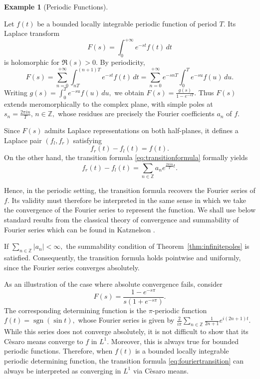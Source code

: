 \documentclass[12pt]{article}
\theoremstyle{definition}
\newtheorem{example}[theorem]{Example}
\begin{document}
\begin{example}[Periodic  Functions]\label{ex:periodic}



Let $f(t)$ be a bounded locally integrable periodic function of period $T$. 
Its Laplace transform
\[
F(s)=\int_0^{+\infty} e^{-st}f(t)\,dt
\]
is holomorphic for $\Re(s)>0$. By periodicity,
\[
F(s)
=
\sum_{n=0}^{+\infty}
\int_{nT}^{(n+1)T}
e^{-st}f(t)\,dt
=
\sum_{n=0}^{+\infty}
e^{-snT}
\int_0^T e^{-su}f(u)\,du.
\]
Writing
$
{\displaystyle g(s)=\int_0^T e^{-su}f(u)\,du,}
$
we obtain $\displaystyle{F(s)=\frac{g(s)}{1-e^{-sT}}.}$
Thus $F(s)$ extends meromorphically to the complex plane, with simple poles at
$\displaystyle{ s_n=\frac{2\pi i n}{T}, \, n\in\mathbb{Z},}$
whose residues are precisely the Fourier coefficients $a_n$ of $f$.

Since $F(s)$ admits Laplace representations on both half-planes, it defines a Laplace pair $(f_l,f_r)$ satisfying
\[
f_r(t)-f_l(t)=f(t).
\]
On the other hand, the transition formula \eqref{eq:transitionformula} formally yields
\begin{equation}\label{eq:fouriertransition}
f_r(t)-f_l(t)
=
\sum_{n\in\mathbb{Z}}
a_n e^{\frac{2\pi i n}{T}t}.
\end{equation}

Hence, in the periodic setting, the transition formula recovers the Fourier series of $f$. 
Its validity must therefore be interpreted in the same sense in which we take the convergence of the Fourier series to represent the function. We shall use below standard results from the classical theory of convergence and summability of Fourier series which can be found in Katznelson \cite{Katznelson}.

If
$
\sum_{n\in\mathbb{Z}} |a_n| < \infty,
$
the summability condition of Theorem~\ref{thm:infinitepoles} is satisfied. 
Consequently, the transition formula holds pointwise and uniformly, since the Fourier series converges absolutely.

As an illustration of the case where absolute convergence fails, consider
\[
F(s)=\frac{1-e^{-s\pi}}{s(1+e^{-s\pi})}.
\]
The corresponding determining function is the $\pi$-periodic function
\(
f(t)=\operatorname{sgn}(\sin t),
\)
whose Fourier series is given by $\displaystyle{\frac{2}{i\pi}\sum_{n\in\mathbb{Z}}
\frac{1}{2n+1}
e^{i(2n+1)t}.}$
 While this series does not converge absolutely, it is not difficult to show that its Cèsaro means converge to $f$ in $L^1.$ Moreover, this is always true for bounded periodic functions. Therefore, when $f(t)$ is a bounded locally integrable periodic determining function, the transition formula \eqref{eq:fouriertransition} can always be interpreted as converging in $L^1$ via Cèsaro means.


\end{example}
\end{document}
